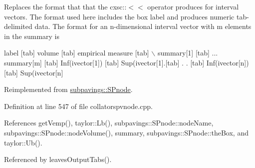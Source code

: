 \-Replaces the format that that the cxsc\-:\-:$<$$<$ operator produces for interval vectors. \-The format used here includes the box label and produces numeric tab-\/delimited data. \-The format for an n-\/dimensional interval vector with m elements in the summary is

label \mbox{[}tab\mbox{]} volume \mbox{[}tab\mbox{]} empirical measure \mbox{[}tab\mbox{]} $\backslash$ summary\mbox{[}1\mbox{]} \mbox{[}tab\mbox{]} ... summary\mbox{[}m\mbox{]} \mbox{[}tab\mbox{]} \-Inf(ivector\mbox{[}1\mbox{]}) \mbox{[}tab\mbox{]} \-Sup(ivector\mbox{[}1\mbox{]}.\mbox{[}tab\mbox{]} . . \mbox{[}tab\mbox{]} \-Inf(ivector\mbox{[}n\mbox{]}) \mbox{[}tab\mbox{]} \-Sup(ivector\mbox{[}n\mbox{]} 

\-Reimplemented from \hyperlink{classsubpavings_1_1SPnode_a0f2381175b37224a185eedbe9601d814}{subpavings\-::\-S\-Pnode}.



\-Definition at line 547 of file collatorspvnode.\-cpp.



\-References get\-Vemp(), taylor\-::\-Lb(), subpavings\-::\-S\-Pnode\-::node\-Name, subpavings\-::\-S\-Pnode\-::node\-Volume(), summary, subpavings\-::\-S\-Pnode\-::the\-Box, and taylor\-::\-Ub().



\-Referenced by leaves\-Output\-Tabs().


